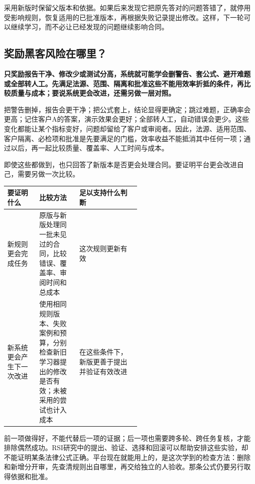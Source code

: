 \documentclass[a4paper,11pt]{ctexart}
\begin{document}
采用新版时保留父版本和依据。如果后来发现它把原先答对的问题答错了，就停用受影响规则，恢复适用的已批准版本，再根据失败记录提出修改。这样，下一轮可以继续学习，而不必让已经发现的问题继续影响合同。

\subsection{奖励黑客风险在哪里？}
\noindent\textbf{只奖励报告干净、修改少或测试分高，系统就可能学会删警告、套公式、避开难题或全部转人工。先满足法源、范围、隔离和批准这些不能用效率折抵的条件，再比较质量与成本；要说系统更会改进，还需另做一层对照。}\par\medskip

把警告删掉，报告会更干净；把公式套上，结论显得更确定；跳过难题，正确率会更高；记住客户A的答案，演示效果会更好；全部转人工，自动错误会更少。这些变化都能让某个指标变好，问题却留给了客户或审阅者。因此，法源、适用范围、客户隔离、必检项和批准是先要满足的门槛，效率收益不能抵消其中任何一项；通过以后，再一起比较质量、覆盖率、人工时间与成本。

即使这些都做到，也只回答了新版本是否更会处理合同。要证明平台更会改进自己，需要另做一次比较。

\begingroup\small\setlength{\tabcolsep}{5pt}\renewcommand{\arraystretch}{1.25}\keepXColumns
\begin{tabularx}{\linewidth}{L{0.24\linewidth} L{0.30\linewidth} X}
\toprule
\textbf{要证明什么} & \textbf{比较方法} & \textbf{足以支持什么判断} \\
\midrule
新规则更会完成任务 & 原版与新版处理同一批未见过的合同，比较错误、覆盖率、审阅时间和总成本 & 这次规则更新有效 \\
新系统更会产生下一次改进 & 使用相同规则版本、失败案例和预算，分别检查新旧学习器提出的修改是否有效；未被采用的尝试也计入成本 & 在这些条件下，新版更善于提出并验证有效改进 \\
\bottomrule
\end{tabularx}
\endgroup

前一项做得好，不能代替后一项的证据；后一项也需要跨多轮、跨任务复核，才能排除偶然成功。RSI研究中的提出、验证、选择和回滚可以帮助安排这些实验，却不能证明某条法律公式正确。平台现在就能用上的，是这次学到的检查方法：删除和新增分开审，先查清规则出自哪里，再交给独立的人验收。那条公式仍要另行取得依据和批准。
\end{document}
